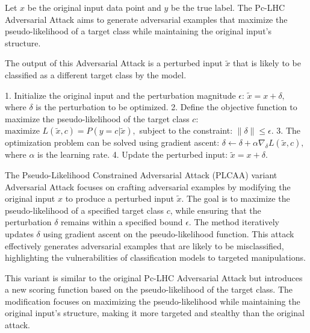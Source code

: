 Let \( x \) be the original input data point and \( y \) be the true label. The Pc-LHC Adversarial Attack aims to generate adversarial examples that maximize the pseudo-likelihood of a target class while maintaining the original input's structure.

The output of this Adversarial Attack is a perturbed input \( \tilde{x} \) that is likely to be classified as a different target class by the model.

1. Initialize the original input and the perturbation magnitude \( \epsilon \):
   $
   \tilde{x} = x + \delta,
   $
   where \( \delta \) is the perturbation to be optimized.
2. Define the objective function to maximize the pseudo-likelihood of the target class \( c \):
   $
   \text{maximize } L(\tilde{x}, c) = P(y = c | \tilde{x}),
   $
   subject to the constraint:
   $
   \|\delta\| \leq \epsilon.
   $
3. The optimization problem can be solved using gradient ascent:
   $
   \delta \leftarrow \delta + \alpha \nabla_{\delta} L(\tilde{x}, c),
   $
   where \( \alpha \) is the learning rate.
4. Update the perturbed input:
   $
   \tilde{x} = x + \delta.
   $

The Pseudo-Likelihood Constrained Adversarial Attack (PLCAA) variant Adversarial Attack focuses on crafting adversarial examples by modifying the original input \( x \) to produce a perturbed input \( \tilde{x} \). The goal is to maximize the pseudo-likelihood of a specified target class \( c \), while ensuring that the perturbation \( \delta \) remains within a specified bound \( \epsilon \). The method iteratively updates \( \delta \) using gradient ascent on the pseudo-likelihood function. This attack effectively generates adversarial examples that are likely to be misclassified, highlighting the vulnerabilities of classification models to targeted manipulations.

This variant is similar to the original Pc-LHC Adversarial Attack but introduces a new scoring function based on the pseudo-likelihood of the target class. The modification focuses on maximizing the pseudo-likelihood while maintaining the original input's structure, making it more targeted and stealthy than the original attack.